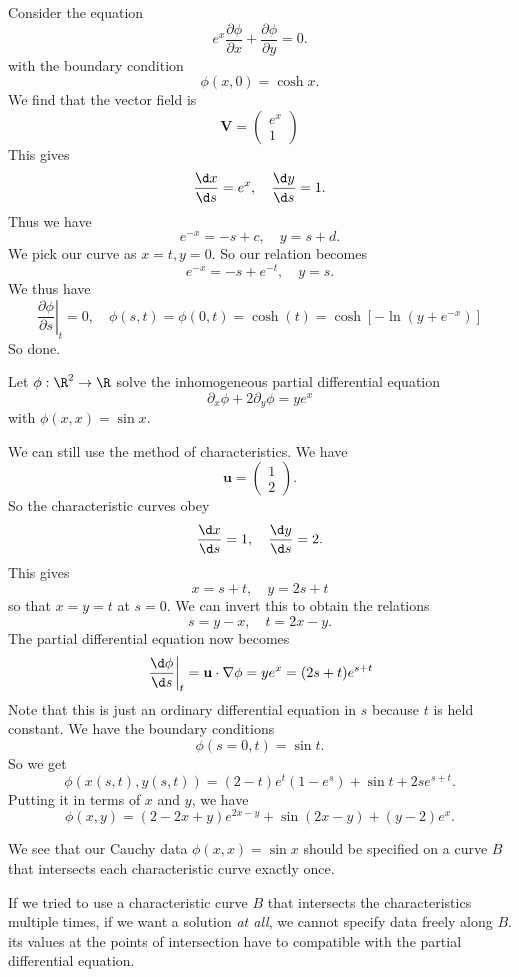 \documentclass[a4paper]{article}
\begin{document}
\begin{eg}
  Consider the equation
  \[
    e^x \frac{\partial \phi}{\partial x} + \frac{\partial \phi}{\partial y} = 0.
  \]
  with the boundary condition
  \[
    \phi(x, 0) = \cosh x.
  \]
  We find that the vector field is
  \[
    \mathbf{V} =
    \begin{pmatrix}
      e^x\\
      1
    \end{pmatrix}
  \]
  This gives
  \[
    \frac{\d x}{\d s} = e^x,\quad \frac{\d y}{\d s} = 1.
  \]
  Thus we have
  \[
    e^{-x} = -s + c,\quad y = s + d.
  \]
  We pick our curve as $x = t, y = 0$. So our relation becomes
  \[
    e^{-x} = -s + e^{-t},\quad y = s.
  \]
  We thus have
  \[
    \left.\frac{\partial \phi}{\partial s}\right|_t = 0,\quad \phi(s, t) = \phi(0, t) = \cosh(t) = \cosh[-\ln (y + e^{-x})]
  \]
  So done.
\end{eg}

\begin{eg}
  Let $\phi: \R^2 \to \R$ solve the inhomogeneous partial differential equation
  \[
    \partial_x \phi + 2 \partial_y \phi = y e^x
  \]
  with $\phi(x, x) = \sin x$.

  We can still use the method of characteristics. We have
  \[
    \mathbf{u} =
    \begin{pmatrix}
      1\\2
    \end{pmatrix}.
  \]
  So the characteristic curves obey
  \[
    \frac{\d x}{\d s} = 1, \quad \frac{\d y}{\d s} = 2.
  \]
  This gives
  \[
    x = s + t,\quad y = 2s + t
  \]
  so that $x = y = t$ at $s = 0$. We can invert this to obtain the relations
  \[
    s = y - x, \quad t = 2x - y.
  \]
  The partial differential equation now becomes
  \[
    \left.\frac{\d \phi}{\d s}\right|_t = \mathbf{u}\cdot \nabla \phi = y e^x = (2s + t)e^{s + t}
  \]
  Note that this is just an ordinary differential equation in $s$ because $t$ is held constant. We have the boundary conditions
  \[
    \phi(s = 0, t) = \sin t.
  \]
  So we get
  \[
    \phi(x(s, t), y(s, t)) = (2 - t)e^t(1 - e^s) + \sin t + 2s e^{s + t}.
  \]
  Putting it in terms of $x$ and $y$, we have
  \[
    \phi(x, y) = (2 - 2x + y) e^{2x - y} + \sin (2x - y) + (y - 2) e^x.
  \]
\end{eg}
We see that our Cauchy data $\phi(x, x) = \sin x$ should be specified on a curve $B$ that intersects each characteristic curve exactly once.

If we tried to use a characteristic curve $B$ that intersects the characteristics multiple times, if we want a solution \emph{at all}, we cannot specify data freely along $B$. its values at the points of intersection have to compatible with the partial differential equation.
\end{document}
